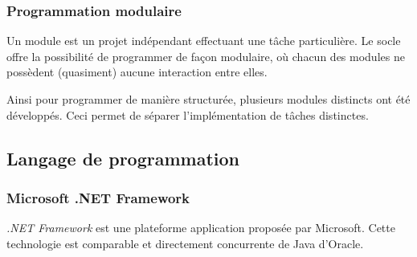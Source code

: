 
\subsubsection{Programmation modulaire}
\label{Programmation modulaire}

Un module est un projet indépendant effectuant une tâche particulière.
Le socle offre la possibilité de programmer de façon modulaire, où chacun des modules ne possèdent (quasiment) aucune interaction entre elles.

Ainsi pour programmer de manière structurée, plusieurs modules distincts ont été développés.
Ceci permet de séparer l'implémentation de tâches distinctes.


\subsection{Langage de programmation}


\subsubsection{Microsoft .NET Framework}

\textit{.NET Framework} est une plateforme application proposée par Microsoft.
Cette technologie est comparable et directement concurrente de Java d'Oracle.

